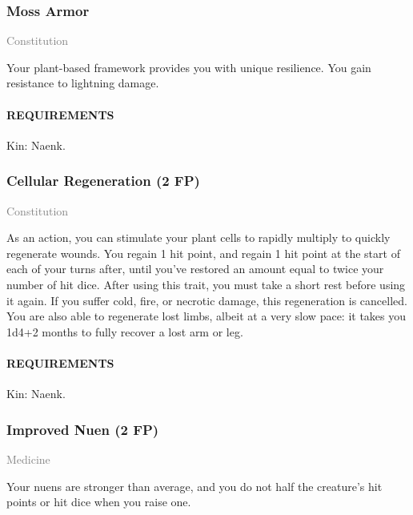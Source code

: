     \subsubsection{Moss Armor} \label{feat::mossarmor}
    \small{\textcolor{gray}{Constitution}}

    \normalsize
    Your plant-based framework provides you with unique resilience.
    You gain resistance to lightning damage.
    \paragraph{REQUIREMENTS} Kin: Naenk.

    \subsubsection{Cellular Regeneration (2 FP)} \label{feat::cellularregeneration}
    \small{\textcolor{gray}{Constitution}}

    \normalsize
    As an action, you can stimulate your plant cells to rapidly multiply to quickly regenerate wounds.
    You regain 1 hit point, and regain 1 hit point at the start of each of your turns after, until you've restored an amount equal to twice your number of hit dice.
    After using this trait, you must take a short rest before using it again.
    If you suffer cold, fire, or necrotic damage, this regeneration is cancelled.
    You are also able to regenerate lost limbs, albeit at a very slow pace: it takes you 1d4+2 months to fully recover a lost arm or leg.
    \paragraph{REQUIREMENTS} Kin: Naenk.

    \subsubsection{Improved Nuen (2 FP)} \label{feat::improvednuen}
    \small{\textcolor{gray}{Medicine}}

    \normalsize
    Your nuens are stronger than average, and you do not half the creature's hit points or hit dice when you raise one.

